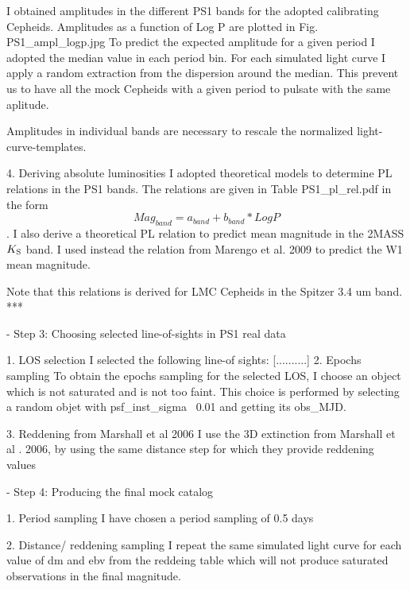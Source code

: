             I obtained amplitudes in the different PS1 bands for the adopted calibrating Cepheids.
            Amplitudes as a function of Log P are plotted in Fig. PS1_ampl_logp.jpg 
            To predict the expected amplitude for a given period I adopted the median value in each period bin.
	    For each simulated light curve I apply
	    a random extraction from the dispersion around the median. This prevent us to have all the
	    mock Cepheids with a given period to pulsate with the same aplitude. 
 
            
            Amplitudes in individual bands are necessary to rescale the normalized light-curve-templates.


        4. Deriving absolute luminosities 
            I adopted theoretical models to determine PL relations in the PS1 bands.
            The relations are given in Table PS1_pl_rel.pdf in the form 
            $$Mag_{band}= a_{band} + b_{band} * Log P $$.
            I also derive a theoretical PL relation to predict mean magnitude in the 2MASS $K_{\rm{S}}$ band.
            I used instead the relation from Marengo et al. 2009 to predict the W1 mean magnitude.
     
            Note that this relations is derived for LMC Cepheids in the Spitzer 3.4 um band. ***


- Step 3: Choosing selected line-of-sights in PS1 real data
        
        1. LOS selection
                I selected the following line-of sights:
               [..........]
        2. Epochs sampling
                To obtain the epochs sampling for the selected LOS, I choose an object which is not saturated and is not too faint.
                This choice is performed by selecting a random objet with psf_inst_sigma ~0.01
                and getting its obs_MJD.
            
        3. Reddening from Marshall et al 2006 
	I use the 3D extinction from Marshall et al . 2006, by using the same distance step for which they provide reddening values

- Step 4: Producing the final mock catalog
        
        1. Period sampling
            I have chosen a period sampling of 0.5 days
        
        2. Distance/ reddening sampling
                I  repeat the same simulated light curve for each value of  dm and ebv  from the reddeing table
                which will not produce saturated observations in the final magnitude.
        

